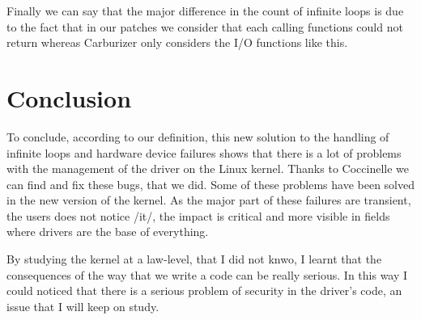 \documentclass[a4paper,12pt]{article}
\begin{document}
Finally we can say that the major difference in the count of infinite loops is due to the fact that in our patches we consider that each calling functions could not return whereas Carburizer only considers the I/O functions like this.
\newpage
\section{Conclusion}
To conclude, according to our definition, this new solution to the handling of infinite loops and hardware device failures shows that there is a lot of problems with the management of the driver on the Linux kernel. Thanks to Coccinelle we can find and fix these bugs, that we did. Some of these problems have been solved in the new version of the kernel. As the major part of these failures are transient, the users does not notice /it/, the impact is critical and more visible in fields where drivers are the base of everything. 

By studying the kernel at a law-level, that I did not knwo, I learnt that the consequences of the way that we write a code can be really serious. In this way I could noticed that there is a serious problem of security in the driver's code, an issue that I will keep on study.






\label{fin}
\end{document}
